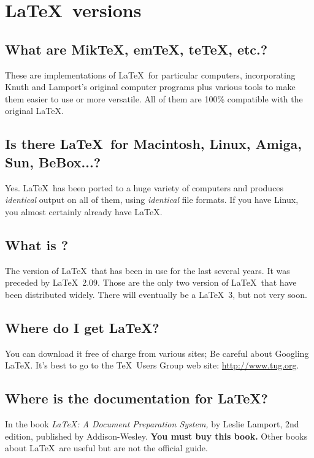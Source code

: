 \documentclass[12pt]{report}
\begin{document}
\section{\LaTeX\ versions}

\subsection{What are Mik\TeX, em\TeX, te\TeX, etc.?}

These are implementations of \LaTeX\ for particular computers, incorporating
Knuth and Lamport's original computer programs plus various tools to make
them easier to use or more versatile.
All of them are 100\% compatible with the original \LaTeX.

\subsection{Is there \LaTeX\ for Macintosh, Linux, Amiga, Sun, BeBox...?}

Yes.  \LaTeX\ has been ported to a huge variety of computers and produces
\emph{identical} output on all of them, using \emph{identical} file formats.
If you have Linux, you almost certainly already have \LaTeX.

\subsection{What is \LaTeXe?}

The version of \LaTeX\ that has been in use for the last several years.
It was preceded by \LaTeX\ 2.09.  Those are the only two version of
\LaTeX\ that have been distributed widely.  There will eventually be
a \LaTeX\ 3, but not very soon.

\subsection{Where do I get \LaTeX?}

You can download it free of charge from various sites;
Be careful about Googling \LaTeX.
It's best to go to the \TeX\ Users Group web site:
\url{http://www.tug.org}.

\subsection{Where is the documentation for \LaTeX?}

In the book \emph{LaTeX: A Document Preparation System,} by Leslie Lamport,
2nd edition, published by Addison-Wesley.  \textbf{You must buy this book.}
Other books about \LaTeX\ are useful but are not the official guide.
\end{document}
